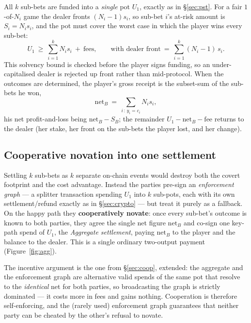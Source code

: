 \documentclass[11pt]{article}
\begin{document}
All $k$ sub-bets are funded into a \emph{single} pot $U_1$, exactly as in \S\ref{sec:pst}. For a fair $1$-of-$N_i$ game the dealer fronts $(N_i-1)s_i$, so sub-bet $i$'s at-risk amount is $S_i = N_i s_i$, and the pot must cover the worst case in which the player wins every sub-bet:
\[
U_1 \ \ge\ \sum_{i=1}^{k} N_i s_i \ +\ \text{fees},
\qquad\text{with dealer front} \ =\ \sum_{i=1}^{k}(N_i-1)\,s_i .
\]
This solvency bound is checked before the player signs funding, so an under-capitalised dealer is rejected up front rather than mid-protocol. When the outcomes are determined, the player's gross receipt is the subset-sum of the sub-bets he won,
\[
\mathrm{net}_B \ =\ \sum_{i \,:\, y_i = c_i} N_i s_i ,
\]
his net profit-and-loss being $\mathrm{net}_B - S_B$; the remainder $U_1 - \mathrm{net}_B - \text{fee}$ returns to the dealer (her stake, her front on the sub-bets the player lost, and her change).

\subsection{Cooperative novation into one settlement}

Settling $k$ sub-bets as $k$ separate on-chain events would destroy both the covert footprint and the cost advantage. Instead the parties pre-sign an \emph{enforcement graph} --- a splitter transaction spending $U_1$ into $k$ sub-pots, each with its own settlement/refund exactly as in \S\ref{sec:crypto} --- but treat it purely as a fallback. On the happy path they \textbf{cooperatively novate}: once every sub-bet's outcome is known to both parties, they agree the single net figure $\mathrm{net}_B$ and co-sign one key-path spend of $U_1$, the \emph{Aggregate settlement}, paying $\mathrm{net}_B$ to the player and the balance to the dealer. This is a single ordinary two-output payment (Figure~\ref{fig:agg}).

The incentive argument is the one from \S\ref{sec:coop}, extended: the aggregate and the enforcement graph are alternative valid spends of the same pot that resolve to the \emph{identical} net for both parties, so broadcasting the graph is strictly dominated --- it costs more in fees and gains nothing. Cooperation is therefore self-enforcing, and the (rarely used) enforcement graph guarantees that neither party can be cheated by the other's refusal to novate.
\end{document}
